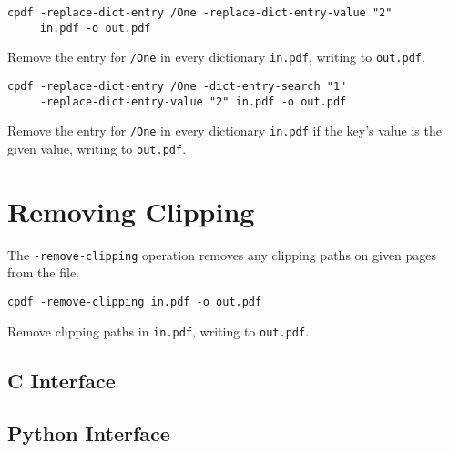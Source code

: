 \documentclass{book}
\begin{document}
  \begin{framed}
  \small\noindent\verb!cpdf -replace-dict-entry /One -replace-dict-entry-value "2"!\\
  \small\noindent\verb!     in.pdf -o out.pdf!

  \vspace{2.5mm}
  \noindent Remove the entry for \texttt{/One} in every dictionary \texttt{in.pdf}, writing to \texttt{out.pdf}. 

  \vspace{2.5mm}

  \small\noindent\verb!cpdf -replace-dict-entry /One -dict-entry-search "1"!\\
  \small\noindent\verb!     -replace-dict-entry-value "2" in.pdf -o out.pdf!

  \vspace{2.5mm}
  \noindent Remove the entry for \texttt{/One} in every dictionary \texttt{in.pdf} if the key's value is the given value, writing to \texttt{out.pdf}. 
  \end{framed}

\section{Removing Clipping}


The \texttt{-remove-clipping} operation removes any clipping paths on given pages from the file.

  \begin{framed}
  \small\noindent\verb!cpdf -remove-clipping in.pdf -o out.pdf!

  \vspace{2.5mm}
  \noindent Remove clipping paths in \texttt{in.pdf}, writing to \texttt{out.pdf}. 
  \end{framed}

\begin{cpdflib}
\clearpage
\section*{C Interface}
\begin{small}\tt

\end{small}
\end{cpdflib}

\begin{pycpdflib}
\clearpage
\section*{Python Interface}
\begin{small}\tt

\end{small}
\end{pycpdflib}
\end{document}
